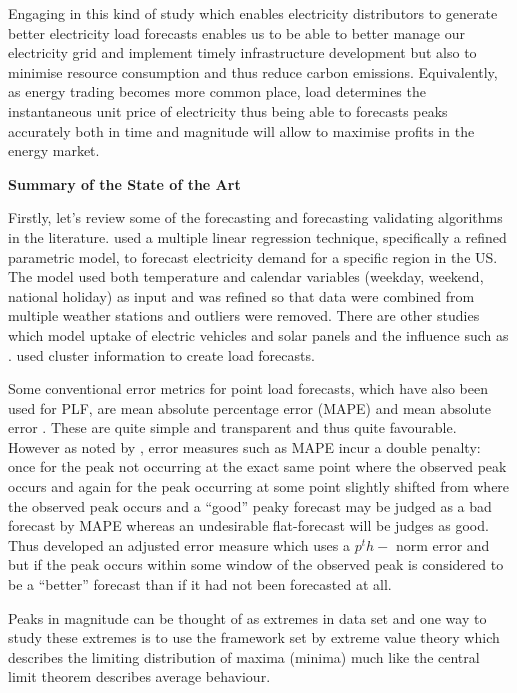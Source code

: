 \documentclass[a4paper]{article}
\begin{document}
Engaging in this kind of study which enables electricity distributors to generate better electricity load forecasts enables us to be able to better manage our electricity grid and implement timely infrastructure development but also to minimise resource consumption and thus reduce carbon emissions. Equivalently, as energy trading becomes more common place, load determines the instantaneous unit price of electricity thus being able to forecasts peaks accurately both in time and magnitude will allow to maximise profits in the energy market. \newline


\noindent \textbf{Summary of the State of the Art}

Firstly, let's review some of the forecasting and forecasting validating algorithms in the literature. \cite{char14} used a multiple linear regression technique, specifically a refined parametric model, to forecast electricity demand for a specific region in the US. The model used both temperature and calendar variables (weekday, weekend, national holiday) as input and was refined so that data were combined from multiple weather stations and outliers were removed. There are other studies which model uptake of electric vehicles and solar panels and the influence such as \cite{danEV17}. \cite{cbaf} used cluster information to create load forecasts.

Some conventional error metrics for point load forecasts, which have also been used for PLF, are mean absolute percentage error (MAPE) and mean absolute error \cite{hong16}. These are quite simple and transparent and thus quite favourable. However as noted by \cite{dan14}, error measures such as MAPE incur a double penalty: once for the peak not occurring at the exact same point where the observed peak occurs and again for the peak occurring at some point slightly shifted from where the observed peak occurs and a ``good'' peaky forecast may be judged as a bad forecast by MAPE whereas an undesirable flat-forecast will be judges as good. Thus \cite{dan14} developed an adjusted error measure which uses a $p^th-$ norm error and but if the peak occurs within some window of the observed peak is considered to be a ``better'' forecast than if it had not been forecasted at all. 

Peaks in magnitude can be thought of as extremes in data set and one way to study these extremes is to use the framework set by extreme value theory which describes the limiting distribution of maxima (minima) much like the central limit theorem describes average behaviour.
\end{document}
